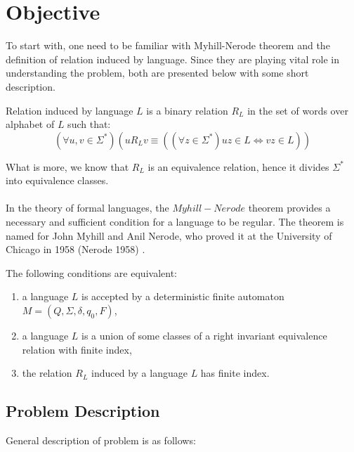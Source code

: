 \documentclass[runningheads,a4paper]{llncs}
\begin{document}
\section{Objective} \label{section:objectives}
To start with, one need to be familiar with Myhill-Nerode theorem and the definition of relation induced by language. Since they are playing vital role in understanding the problem, both are presented below with some short description. 

\begin{definition}
Relation induced by language $L$ is a binary relation $R_{L}$ in the set of words over alphabet of $L$ such that:
\[
(\forall{u,v \in \Sigma^{*}})(u R_{L} v \equiv ((\forall z \in \Sigma^{*}) uz \in L \Leftrightarrow vz \in L))
\]
\end{definition}
What is more, we know that $R_{L}$ is an equivalence relation, hence it divides $\Sigma^{*}$ into equivalence classes.

\paragraph{}
In the theory of formal languages, the $Myhill-Nerode$ theorem provides a necessary and sufficient condition for a language to be regular. The theorem is named for John Myhill and Anil Nerode, who proved it at the University of Chicago in 1958 (Nerode 1958) \cite{Myhill_Nerode}.

\begin{theorem}\label{Theorem:Myhill_Nerode}
The following conditions are equivalent:
\begin{enumerate}
\item a language $L$ is accepted by a deterministic finite automaton $M = (Q,\Sigma,\delta,q_0,F)$,
\item a language $L$ is a union of some classes of a right invariant equivalence relation with finite index,
\item the relation $R_{L}$ induced by a language $L$ has finite index.
\end{enumerate}
\end{theorem}

\subsection{Problem Description} \label{sub:definition}
General description of problem is as follows:
\end{document}
